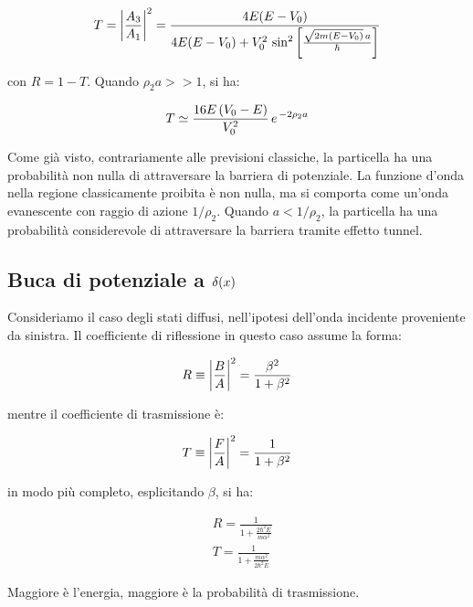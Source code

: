 \begin{itemize}
	\begin{align*}
		T = \qty|\frac{A_3}{A_1}|^2= \frac{4 E \qty(E - V_0)}{4 E \qty(E - V_0) + V_0^2 \, \sin^2\qty[ \frac{\sqrt{2 m \qty(E - V_0)} \, a}{\hbar}]}
	\end{align*}
	
		con $R = 1 - T$. Quando $\rho_2 a >> 1$, si ha:
		
	\begin{align*}
		T \simeq \frac{16 E \, \qty(V_0 - E)}{V_0^2} \, e^{\, -2 \rho_2 a}
	\end{align*}
	
		Come già visto, contrariamente alle previsioni classiche, la particella ha una probabilità non nulla di attraversare la barriera di potenziale. La funzione d'onda nella regione classicamente proibita è non nulla, ma si comporta come un'onda evanescente con raggio di azione $1/\rho_2$. Quando $a < 1/\rho_2$, la particella ha una probabilità considerevole di attraversare la barriera tramite effetto tunnel.
		
\end{itemize}

\subsection{Buca di potenziale a $\delta\qty(x)$}

	Consideriamo il caso degli stati diffusi, nell'ipotesi dell'onda incidente proveniente da sinistra. Il coefficiente di riflessione in questo caso assume la forma:
	
\begin{align*}
	R \equiv \qty|\frac{B}{A}|^2 = \frac{\beta^2}{1 + \beta^2}
\end{align*}

	mentre il coefficiente di trasmissione è:
	
\begin{align*}
	T \equiv \qty|\frac{F}{A}|^2 = \frac{1}{1 + \beta^2}
\end{align*}

	in modo più completo, esplicitando $\beta$, si ha:
	
\begin{align*}
	& R = \frac{1}{1 + \frac{2 \hbar^2 E}{m \alpha^2}} \\
	& T = \frac{1}{1 + \frac{m \alpha^2}{2 \hbar^2 E}}
\end{align*}

	Maggiore è l'energia, maggiore è la probabilità di trasmissione.

